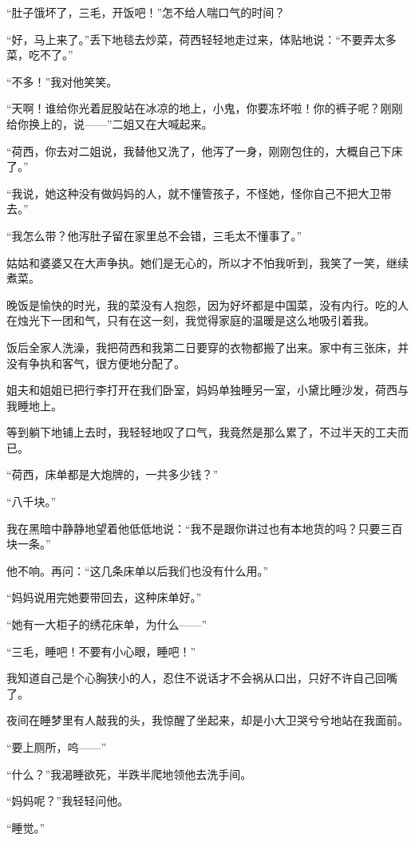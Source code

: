 \par “肚子饿坏了，三毛，开饭吧！”怎不给人喘口气的时间？
\par “好，马上来了。”丢下地毯去炒菜，荷西轻轻地走过来，体贴地说：“不要弄太多菜，吃不了。”
\par “不多！”我对他笑笑。
\par “天啊！谁给你光着屁股站在冰凉的地上，小鬼，你要冻坏啦！你的裤子呢？刚刚给你换上的，说——”二姐又在大喊起来。
\par “荷西，你去对二姐说，我替他又洗了，他泻了一身，刚刚包住的，大概自己下床了。”
\par “我说，她这种没有做妈妈的人，就不懂管孩子，不怪她，怪你自己不把大卫带去。”
\par “我怎么带？他泻肚子留在家里总不会错，三毛太不懂事了。”
\par 姑姑和婆婆又在大声争执。她们是无心的，所以才不怕我听到，我笑了一笑，继续煮菜。
\par 晚饭是愉快的时光，我的菜没有人抱怨，因为好坏都是中国菜，没有内行。吃的人在烛光下一团和气，只有在这一刻，我觉得家庭的温暖是这么地吸引着我。
\par 饭后全家人洗澡，我把荷西和我第二日要穿的衣物都搬了出来。家中有三张床，并没有争执和客气，很方便地分配了。
\par 姐夫和姐姐已把行李打开在我们卧室，妈妈单独睡另一室，小黛比睡沙发，荷西与我睡地上。
\par 等到躺下地铺上去时，我轻轻地叹了口气，我竟然是那么累了，不过半天的工夫而已。
\par “荷西，床单都是大炮牌的，一共多少钱？”
\par “八千块。”
\par 我在黑暗中静静地望着他低低地说：“我不是跟你讲过也有本地货的吗？只要三百块一条。”
\par 他不响。再问：“这几条床单以后我们也没有什么用。”
\par “妈妈说用完她要带回去，这种床单好。”
\par “她有一大柜子的绣花床单，为什么——”
\par “三毛，睡吧！不要有小心眼，睡吧！”
\par 我知道自己是个心胸狭小的人，忍住不说话才不会祸从口出，只好不许自己回嘴了。
\par 夜间在睡梦里有人敲我的头，我惊醒了坐起来，却是小大卫哭兮兮地站在我面前。
\par “要上厕所，呜——”
\par “什么？”我渴睡欲死，半跌半爬地领他去洗手间。
\par “妈妈呢？”我轻轻问他。
\par “睡觉。”
